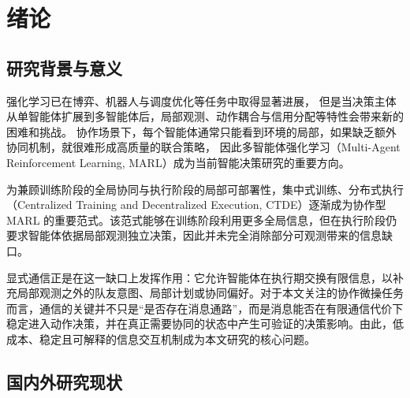 %
%
%
%
%
%
%
%

\chapter{绪论}

\section{研究背景与意义}

强化学习已在博弈、机器人与调度优化等任务中取得显著进展，
但是当决策主体从单智能体扩展到多智能体后，局部观测、动作耦合与信用分配等特性会带来新的困难和挑战。
协作场景下，每个智能体通常只能看到环境的局部，如果缺乏额外协同机制，就很难形成高质量的联合策略，
因此多智能体强化学习（Multi-Agent Reinforcement Learning, MARL）成为当前智能决策研究的重要方向。

为兼顾训练阶段的全局协同与执行阶段的局部可部署性，集中式训练、分布式执行（Centralized Training and Decentralized Execution, CTDE）逐渐成为协作型 MARL 的重要范式。该范式能够在训练阶段利用更多全局信息，但在执行阶段仍要求智能体依据局部观测独立决策，因此并未完全消除部分可观测带来的信息缺口。

显式通信正是在这一缺口上发挥作用：它允许智能体在执行期交换有限信息，以补充局部观测之外的队友意图、局部计划或协同偏好。对于本文关注的协作微操任务而言，通信的关键并不只是“是否存在消息通路”，而是消息能否在有限通信代价下稳定进入动作决策，并在真正需要协同的状态中产生可验证的决策影响。由此，低成本、稳定且可解释的信息交互机制成为本文研究的核心问题。

\section{国内外研究现状}

